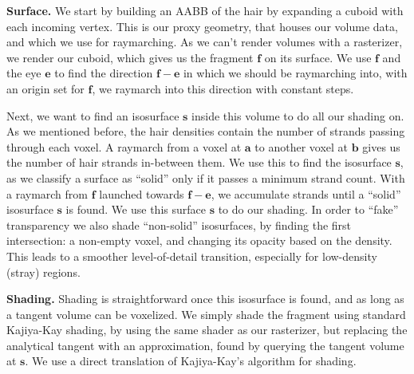 \documentclass{egpubl}
\begin{document}

\noindent \textbf{Surface. } We start by building an AABB of the hair by expanding a cuboid with each incoming vertex. This is our proxy geometry, that houses our volume data, and which we use for raymarching. As we can't render volumes with a rasterizer, we render our cuboid, which gives us the fragment $\mathbf{f}$ on its surface. We use $\mathbf{f}$ and the eye $\mathbf{e}$ to find the direction $\mathbf{f} - \mathbf{e}$ in which we should be raymarching into, with an origin set for $\mathbf{f}$, we raymarch into this direction with constant steps.

Next, we want to find an isosurface $\mathbf{s}$ inside this volume to do all our shading on. As we mentioned before, the hair densities contain the number of strands passing through each voxel. A raymarch from a voxel at $\mathbf{a}$ to another voxel at $\mathbf{b}$ gives us the number of hair strands in-between them. We use this to find the isosurface $\mathbf{s}$, as we classify a surface as ``solid'' only if it passes a minimum strand count. With a raymarch from $\mathbf{f}$ launched towards $\mathbf{f} - \mathbf{e}$, we accumulate strands until a ``solid'' isosurface $\mathbf{s}$ is found. We use this surface $\mathbf{s}$ to do our shading. In order to ``fake'' transparency we also shade ``non-solid'' isosurfaces, by finding the first intersection: a non-empty voxel, and changing its opacity based on the density. This leads to a smoother level-of-detail transition, especially for low-density (stray) regions.

\noindent \textbf{Shading. } Shading is straightforward once this isosurface is found, and as long as a tangent volume can be voxelized. We simply shade the fragment using standard Kajiya-Kay shading, by using the same shader as our rasterizer, but replacing the analytical tangent with an approximation, found by querying the tangent volume at $\mathbf{s}$. We use a direct translation of Kajiya-Kay's \cite{kajiya1989rendering} algorithm for shading.

\end{document}
